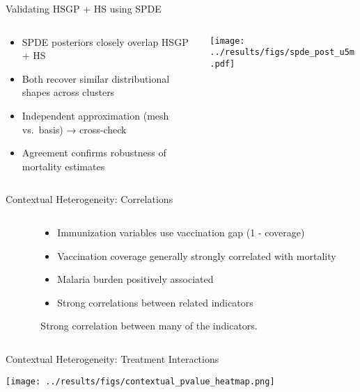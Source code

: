 \documentclass[aspectratio=169]{beamer}\usepackage[]{graphicx}\usepackage[dvipsnames]{xcolor}
\begin{document}
\begin{frame}{Validating HSGP + HS using SPDE}
\begin{columns}
\begin{column}{0.4\textwidth}
\begin{itemize}
  \item \textcolor{SpdeGreen}{SPDE posteriors} closely overlap \textcolor{PostBlue}{HSGP + HS}
  \item Both recover similar distributional shapes across clusters
  \item Independent approximation (mesh vs.~basis) → cross-check
  \item Agreement confirms robustness of mortality estimates
\end{itemize}
\end{column}
\begin{column}{0.6\textwidth}
\begin{center}
\texttt{[image: ../results/figs/spde\_post\_u5m.pdf]}
\end{center}
\end{column}
\end{columns}
\end{frame}

\begin{frame}{Contextual Heterogeneity: Correlations}
\begin{columns}
\begin{column}{0.5\textwidth}
\begin{center}
\end{center}
\end{column}
\begin{column}{0.5\textwidth}
\begin{itemize}
  \item Immunization variables use vaccination gap (1 - coverage) 
  \item Vaccination coverage generally strongly correlated with mortality
  \item Malaria burden positively associated
  \item Strong correlations between related indicators
\end{itemize}
Strong correlation between many of the indicators.
\end{column}
\end{columns}
\end{frame}

\begin{frame}{Contextual Heterogeneity: Treatment Interactions}
\begin{center}
\texttt{[image: ../results/figs/contextual\_pvalue\_heatmap.png]}
\end{center}
\end{frame}
\end{document}
